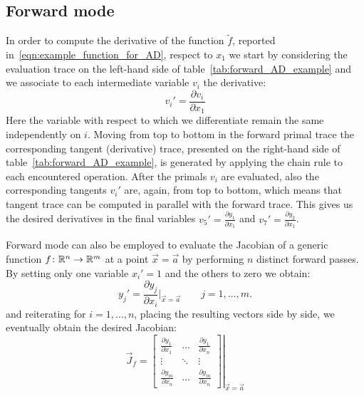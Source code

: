 

\subsection{Forward mode}
\label{subsec:forward_mode_AD}

In order to compute the derivative of the function $\tilde{f}$, reported in~\eqref{eqn:example_function_for_AD}, respect to $x_1$ we start by considering the evaluation trace on the left-hand side of table~\ref{tab:forward_AD_example} and we associate to each intermediate variable $ v_i$ the derivative:
\[
	v_i' = \frac{\partial v_i}{\partial x_1}
\]
Here the variable with respect to which we differentiate remain the same independently on $i$.
Moving from top to bottom in the forward primal trace the corresponding tangent (derivative) trace, presented on the right-hand side of table~\ref{tab:forward_AD_example}, is generated by applying the chain rule to each encountered operation. After the primals $v_i$ are evaluated, also the corresponding tangents $v_i'$ are, again, from top to bottom, which means that tangent trace can be computed in parallel with the forward trace. This gives us the desired derivatives in the final variables $v_5' = \frac{\partial y_1}{\partial x_1}$ and $v_7' = \frac{\partial y_2}{\partial x_1}$.

\medskip
Forward mode can also be employed to evaluate the Jacobian of a generic function $f \colon \mathbb{R}^n \to \mathbb{R}^m$ at a point $\vec{x} = \vec{a}$ by performing $n$ distinct forward passes. By setting only one variable $x_i'=1$ and the others to zero we obtain:
\[
	y_j' = \frac{\partial y_j}{\partial x_i}\bigg|_{\vec{x}=\vec{a}} \qquad j=1,\dots,m.
\]
and reiterating for $i=1,\dots,n$, placing the resulting vectors side by side, we eventually obtain the desired Jacobian:
\[
\vec{J}_f =
\left.
\begin{bmatrix}
	\frac{\partial y_1}{\partial x_1} &  \dots  & \frac{\partial y_1}{\partial x_n}  \\
	\vdots							  & \ddots  & \vdots							 \\
	\frac{\partial y_m}{\partial x_n} &  \dots  & \frac{\partial y_m}{\partial x_n}
\end{bmatrix}
\right|_{\vec{x} = \vec{a}}
\]

